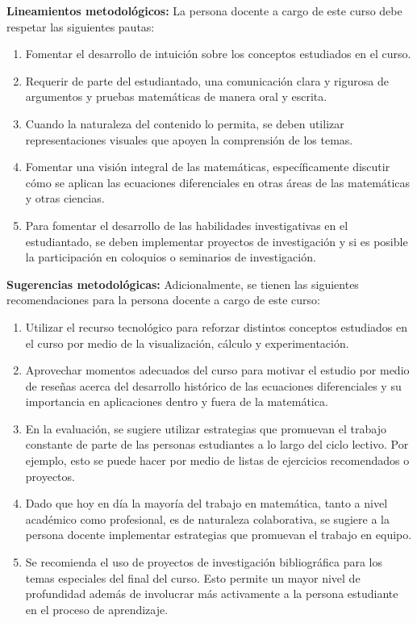 \begin{refsection}
\noindent \textbf{Lineamientos metodológicos:} La persona docente a cargo de este curso debe respetar las siguientes pautas:
\begin{enumerate}
    \item Fomentar el desarrollo de intuición sobre los conceptos estudiados en el curso. 
    \item Requerir de parte del estudiantado, una comunicación clara y rigurosa de argumentos y pruebas matemáticas de manera oral y escrita.
    \item Cuando la naturaleza del contenido lo permita, se deben utilizar representaciones visuales que apoyen la comprensión de los temas.
    \item Fomentar una visión integral de las matemáticas, específicamente discutir cómo se aplican las ecuaciones diferenciales en otras áreas de las matemáticas y otras ciencias.
    \item Para fomentar el desarrollo de las habilidades investigativas en el estudiantado, se deben implementar proyectos de investigación y si es posible la participación en coloquios o seminarios de investigación.
\end{enumerate}

\textbf{Sugerencias metodológicas:} Adicionalmente, se tienen las siguientes recomendaciones para la persona docente a cargo de este curso:
\begin{enumerate}
    \item Utilizar el recurso tecnológico para reforzar distintos conceptos estudiados en el curso por medio de la visualización, cálculo y experimentación.
    \item Aprovechar momentos adecuados del curso para motivar el estudio por medio de reseñas acerca del desarrollo histórico de las ecuaciones diferenciales y su importancia en aplicaciones dentro y fuera de la matemática. 
    \item En la evaluación, se sugiere utilizar estrategias que promuevan el trabajo constante de parte de las personas estudiantes a lo largo del ciclo lectivo. Por ejemplo, esto se puede hacer por medio de listas de ejercicios recomendados o proyectos.
    \item Dado que hoy en día la mayoría del trabajo en matemática, tanto a nivel académico como profesional, es de naturaleza colaborativa, se sugiere a la persona docente implementar estrategias que promuevan el trabajo en equipo.
    \item Se recomienda el uso de proyectos de investigación bibliográfica para los temas especiales del final del curso. Esto permite un mayor nivel de profundidad además de involucrar más activamente a la persona estudiante en el proceso de aprendizaje.
\end{enumerate}


\end{refsection}
